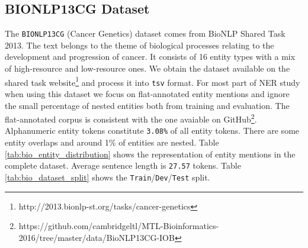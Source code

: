 \subsection{BIONLP13CG Dataset}

The \texttt{BIONLP13CG}\cite{} (Cancer Genetics) dataset comes from BioNLP Shared Task 2013. The text belongs to the theme of biological processes relating to the development and progression of cancer. It consists of 16 entity types with a mix of high-resource and low-resource ones. We obtain the dataset available on the shared task website\footnote{http://2013.bionlp-st.org/tasks/cancer-genetics} and process it into \texttt{tsv} format. For most part of NER study when using this dataset we focus on flat-annotated entity mentions and ignore the small percentage of nested entities both from training and evaluation. The flat-annotated corpus is consistent with the one avaiable on GitHub\footnote{https://github.com/cambridgeltl/MTL-Bioinformatics-2016/tree/master/data/BioNLP13CG-IOB}. Alphanumeric entity tokens constitute \texttt{3.08\%} of all entity tokens. There are some entity overlaps and around 1\% of entities are nested. Table \ref{tab:bio_entity_distribution} shows the representation of entity mentions in the complete dataset. Average sentence length is \texttt{27.57} tokens. Table \ref{tab:bio_dataset_split} shows the \texttt{Train}/\texttt{Dev}/\texttt{Test} split. 

